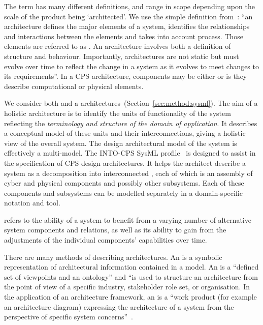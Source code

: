 The term  has many different definitions, and range in scope depending upon the scale of the product being `architected'. We use the simple definition from~\cite{COMPASSD22.6}:  ``an architecture defines the major elements of a system, identifies the relationships and interactions between the elements and takes into account process. Those elements are referred to as . An architecture involves both a definition of structure and behaviour. Importantly, architectures are not static but must evolve over time to reflect the change in a system as it evolves to meet changes to its requirements''. In a CPS architecture, components may be either  or  is they describe computational or physical elements.

We consider both  and a  architectures~(Section~\ref{sec:method:sysml}). The aim of a holistic architecture is to identify the units of functionality of the system reflecting the \emph{terminology and structure of the domain of application}. It describes a conceptual model of these units and their interconnections, giving a holistic view of the overall system. The design architectural model of the system is effectively a multi-model. The INTO-CPS SysML profile~\cite{INTOCPSD2.1a} is designed to assist in the specification of CPS design architectures. It helps the architect describe a system as a decomposition into interconnected , each of which is an assembly of cyber and physical components and possibly other subsystems. Each of these components and subsystems can be modelled separately in a domain-specific notation and tool.

 refers to the ability of a system to benefit from a varying number of alternative system components and relations, as well as its ability to gain from the adjustments of the individual components' capabilities over time.

There are many methods of describing architectures. An  is a symbolic representation of architectural information contained in a model. An  is a ``defined set of viewpoints and an ontology'' and ``is used to structure an architecture from the point of view of a specific industry, stakeholder role set, or organisation. In the application of an architecture framework, an  is a ``work product (for example an architecture diagram) expressing the architecture of a system from the perspective of specific system concerns''~\cite{COMPASSD22.6}.


